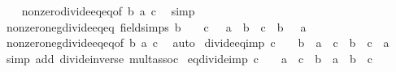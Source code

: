 \begin{isabellebody}
%
\isadelimproof
\ \ %
\endisadelimproof
%
\isatagproof
{}\isamarkupfalse%
\ nonzero{\isacharunderscore}{\kern0pt}divide{\isacharunderscore}{\kern0pt}eq{\isacharunderscore}{\kern0pt}eq{\isacharbrackleft}{\kern0pt}of\ b\ {\isachardoublequoteopen}{\isacharminus}{\kern0pt}a{\isachardoublequoteclose}\ c{\isacharbrackright}{\kern0pt}\ \isamarkupfalse%
\ simp%
\endisatagproof
{\isafoldproof}%
%
\isadelimproof
\isanewline
%
\endisadelimproof
\isanewline
{}\isamarkupfalse%
\ nonzero{\isacharunderscore}{\kern0pt}neg{\isacharunderscore}{\kern0pt}divide{\isacharunderscore}{\kern0pt}eq{\isacharunderscore}{\kern0pt}eq{}\ {\isacharbrackleft}{\kern0pt}field{\isacharunderscore}{\kern0pt}simps{\isacharbrackright}{\kern0pt}{\isacharcolon}{\kern0pt}\ {\isachardoublequoteopen}b\ {\isasymnoteq}\ {}\ {\isasymLongrightarrow}\ c\ {\isacharequal}{\kern0pt}\ {\isacharminus}{\kern0pt}\ {\isacharparenleft}{\kern0pt}a\ {\isacharslash}{\kern0pt}\ b{\isacharparenright}{\kern0pt}\ {\isasymlongleftrightarrow}\ c\ {\isacharasterisk}{\kern0pt}\ b\ {\isacharequal}{\kern0pt}\ {\isacharminus}{\kern0pt}\ a{\isachardoublequoteclose}\isanewline
%
\isadelimproof
\ \ %
\endisadelimproof
%
\isatagproof
{}\isamarkupfalse%
\ nonzero{\isacharunderscore}{\kern0pt}neg{\isacharunderscore}{\kern0pt}divide{\isacharunderscore}{\kern0pt}eq{\isacharunderscore}{\kern0pt}eq{\isacharbrackleft}{\kern0pt}of\ b\ a\ c{\isacharbrackright}{\kern0pt}\ \isamarkupfalse%
\ auto%
\endisatagproof
{\isafoldproof}%
%
\isadelimproof
\isanewline
%
\endisadelimproof
\isanewline
{}\isamarkupfalse%
\ divide{\isacharunderscore}{\kern0pt}eq{\isacharunderscore}{\kern0pt}imp{\isacharcolon}{\kern0pt}\ {\isachardoublequoteopen}c\ {\isasymnoteq}\ {}\ {\isasymLongrightarrow}\ b\ {\isacharequal}{\kern0pt}\ a\ {\isacharasterisk}{\kern0pt}\ c\ {\isasymLongrightarrow}\ b\ {\isacharslash}{\kern0pt}\ c\ {\isacharequal}{\kern0pt}\ a{\isachardoublequoteclose}\isanewline
%
\isadelimproof
\ \ %
\endisadelimproof
%
\isatagproof
{}\isamarkupfalse%
\ {\isacharparenleft}{\kern0pt}simp\ add{\isacharcolon}{\kern0pt}\ divide{\isacharunderscore}{\kern0pt}inverse\ mult{\isachardot}{\kern0pt}assoc{\isacharparenright}{\kern0pt}%
\endisatagproof
{\isafoldproof}%
%
\isadelimproof
\isanewline
%
\endisadelimproof
\isanewline
{}\isamarkupfalse%
\ eq{\isacharunderscore}{\kern0pt}divide{\isacharunderscore}{\kern0pt}imp{\isacharcolon}{\kern0pt}\ {\isachardoublequoteopen}c\ {\isasymnoteq}\ {}\ {\isasymLongrightarrow}\ a\ {\isacharasterisk}{\kern0pt}\ c\ {\isacharequal}{\kern0pt}\ b\ {\isasymLongrightarrow}\ a\ {\isacharequal}{\kern0pt}\ b\ {\isacharslash}{\kern0pt}\ c{\isachardoublequoteclose}\isanewline

\end{isabellebody}
